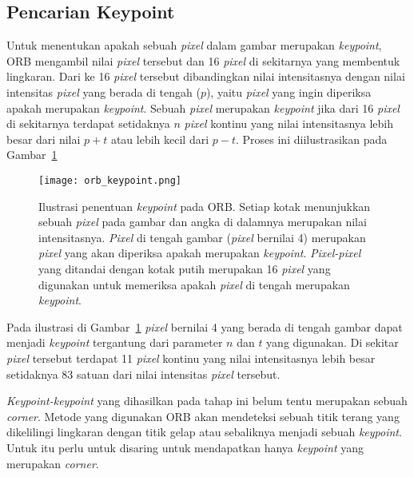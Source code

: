 \subsection{Pencarian Keypoint}
\label{subsec:orb_keypoint}
Untuk menentukan apakah sebuah \textit{pixel} dalam gambar merupakan \textit{keypoint}, ORB mengambil nilai \textit{pixel} tersebut dan 16 \textit{pixel} di sekitarnya yang membentuk lingkaran. Dari ke 16 \textit{pixel} tersebut dibandingkan nilai intensitasnya dengan nilai intensitas \textit{pixel} yang berada di tengah ($p$), yaitu \textit{pixel} yang ingin diperiksa apakah merupakan \textit{keypoint}. Sebuah \textit{pixel} merupakan \textit{keypoint} jika dari 16 \textit{pixel} di sekitarnya terdapat setidaknya $n$ \textit{pixel} kontinu yang nilai intensitasnya lebih besar dari nilai $p + t$ atau lebih kecil dari $p - t$. Proses ini diilustrasikan pada Gambar~\ref{fig:orb_keypoint}

\begin{figure}[H]
	\centering
	\texttt{[image: orb\_keypoint.png]}
	\caption{Ilustrasi penentuan \textit{keypoint} pada ORB. Setiap kotak menunjukkan sebuah \textit{pixel} pada gambar dan angka di dalamnya merupakan nilai intensitasnya. \textit{Pixel} di tengah gambar (\textit{pixel} bernilai 4) merupakan \textit{pixel} yang akan diperiksa apakah merupakan \textit{keypoint}. \textit{Pixel-pixel} yang ditandai dengan kotak putih merupakan 16 \textit{pixel} yang digunakan untuk memeriksa apakah \textit{pixel} di tengah merupakan \textit{keypoint}.}
	\label{fig:orb_keypoint}	
\end{figure}

Pada ilustrasi di Gambar~\ref{fig:orb_keypoint} \textit{pixel} bernilai 4 yang berada di tengah gambar dapat menjadi \textit{keypoint} tergantung dari parameter $n$ dan $t$ yang digunakan. Di sekitar \textit{pixel} tersebut terdapat 11 \textit{pixel} kontinu yang nilai intensitasnya lebih besar setidaknya 83 satuan dari nilai intensitas \textit{pixel} tersebut.

\textit{Keypoint-keypoint} yang dihasilkan pada tahap ini belum tentu merupakan sebuah \textit{corner}. Metode yang digunakan ORB akan mendeteksi sebuah titik terang yang dikelilingi lingkaran dengan titik gelap atau sebaliknya menjadi sebuah \textit{keypoint}. Untuk itu perlu untuk disaring untuk mendapatkan hanya \textit{keypoint} yang merupakan \textit{corner}. 

